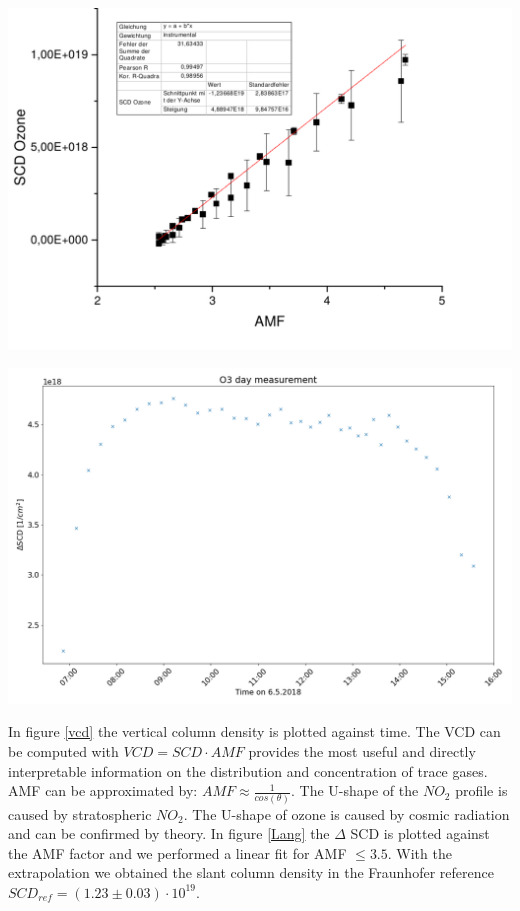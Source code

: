 \documentclass[12pt, english]{scrartcl} %
\newenvironment{Figure}
  {\par\medskip\noindent\minipage{\linewidth}}
  {\endminipage\par\medskip}
\begin{document}
\begin{multicols}{2}
\begin{Figure}
  \label{O2}
\end{Figure}
\begin{Figure}
 \centering
 \captionsetup{format=plain}
 \includegraphics[width=\linewidth]{graphics/o3langley.pdf}
  \label{Lang}
\end{Figure}
\begin{Figure}
 \centering
 \captionsetup{format=plain}
 \includegraphics[width=\linewidth]{graphics/03vcd.png}
  \label{vcd}
\end{Figure}
In figure \ref{vcd} the vertical column density is plotted against time. The VCD can be computed with $VCD = SCD \cdot AMF$ provides the most useful and directly interpretable information on the distribution and concentration of trace gases. AMF can be approximated by: $AMF \approx \frac{1}{cos(\theta)}$. The U-shape of the $NO_2$ profile is caused by stratospheric $NO_2$. The U-shape of ozone is caused by cosmic radiation and can be confirmed by theory. In figure \ref{Lang} the $\Delta$ SCD is plotted against the AMF factor and we performed a linear fit for AMF $\leq 3.5$. With the extrapolation we obtained the slant column density in the Fraunhofer reference $SCD_{ref} =( 1.23\pm 0.03 ) \cdot 10^{19} $.

\end{multicols}
\end{document}
